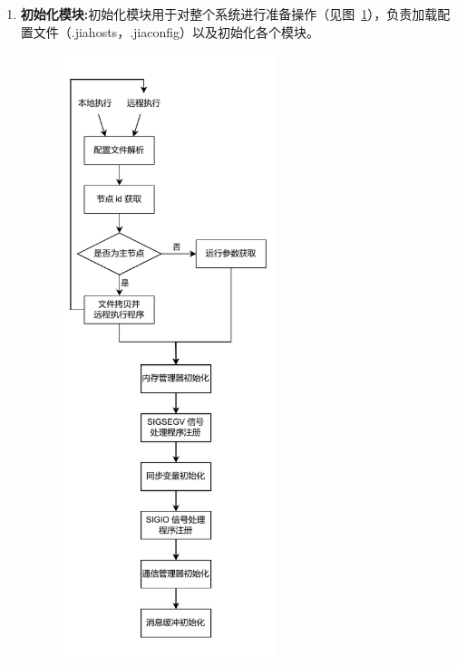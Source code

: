 {    \begin{enumerate}[label=\arabic*.]
        \item \textbf{初始化模块:}初始化模块用于对整个系统进行准备操作（见图~\ref{fig:JIAJIA-init}），负责加载配置文件（.jiahosts，.jiaconfig）以及初始化各个模块。
              \begin{figure}[!htbp]
                  \centering
                  \includegraphics[width=0.6\textwidth]{Img/JIAJIA初始化模块.drawio.pdf}
                  \label{fig:JIAJIA-init}
              \end{figure}


\end{enumerate}}
